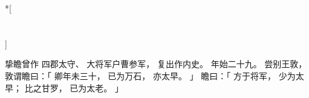 
\pagebreak
\switchcolumn[0]*[\section{}]

挚瞻曾作
四郡太守、
大将军户曹参军，
复出作内史。
年始二十九。
尝别王敦，
敦谓瞻曰：「
    卿年未三十，
    已为万石，
    亦太早。
」
瞻曰：「
    方于将军，
    少为太早；
    比之甘罗，
    已为太老。
」

\switchcolumn


